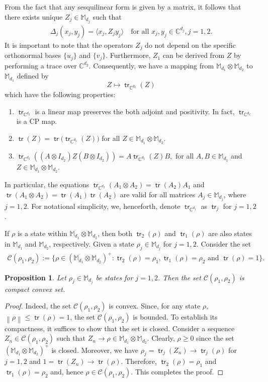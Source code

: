 \documentclass[10pt,reqno]{amsart}
\theoremstyle{definition}
\theoremstyle{plain}
\newtheorem{prop}[defn]{Proposition}
\theoremstyle{remark}
\renewcommand{\sf}[1]{\textsf{#1}}
\newcommand{\mbb}[1]{\mathbb{#1}}
\newcommand{\msc}[1]{\mathscr{#1}}
\newcommand{\norm}[1]{\left\lVert#1\right\rVert}
\newcommand{\M}[1]{\mbb{M}_{#1}}%
\newcommand{\ip}[1]{\langle#1\rangle}
\DeclareMathOperator{\tr}{\sf{tr}}
\numberwithin{equation}{section}%
\begin{document}
From the fact that any sesquilinear form is given by a matrix, it follows that there exists unique $Z_j\in\M{d_j}$ such that 
\begin{align*}
	\Delta_j(x_j,y_j)=\ip{x_j, Z_jy_j} \quad \text{for all } x_j,y_j\in\mbb{C}^{d_j}, j=1,2.
\end{align*}
It is important to note that the operators $Z_j$ do not depend on the specific orthonormal bases $\{u_j\}$ and $\{v_j\}$. Furthermore, $Z_1$ can be derived from $Z$ by performing a trace over $\mbb{C}^{d_2}$. Consequently, we have a mapping from $\M{d_1}\otimes\M{d_2}$ to $\M{d_1}$ defined by
$$Z\mapsto\tr_{\mbb{C}^{d_2}}(Z)$$
which have the following properties:
\begin{enumerate}[label=(\roman*)]
	\item $\tr_{\mbb{C}^{d_2}}$ is a linear map preserves the both adjoint and positivity. In fact, $\tr_{\mbb{C}^{d_2}}$ is a CP map.
	\item $\tr(Z)=\tr\big(\tr_{\mbb{C}^{d_2}}(Z)\big)$ for all $Z\in\M{d_1}\otimes\M{d_2}$.
	\item $\tr_{\mbb{C}^{d_2}}((A\otimes I_{d_2})Z(B\otimes I_{d_2}))=A\tr_{\mbb{C}^{d_2}}(Z)B,$ for all $A,B\in\M{d_1}$ and $Z\in\M{d_1}\otimes\M{d_2}$. 
\end{enumerate}
 In particular, the equations $\tr_{\mbb{C}^{d_2}}(A_1\otimes A_2)=\tr(A_2)A_1$ and $\tr(A_1\otimes A_2)=\tr(A_1)\tr(A_2)$ are valid for all matrices $A_j\in\M{d_j}$, where $j=1,2$. For notational simplicity, we, henceforth, denote $\tr_{\mbb{C}^{d_j}}$ as $\tr_j$ for $j=1,2$.
 
 
 
 If $\rho$ is a state within $\M{d_1}\otimes\M{d_2}$, then both $\tr_2(\rho)$ and $\tr_1(\rho)$ are also states in $\M{d_1}$ and $\M{d_2}$, respectively. Given a state $\rho_j\in\M{d_j}$ for $j=1,2$. Consider the set 
 \begin{align*}
 	\msc{C}(\rho_1,\rho_2):=\{\rho\in(\M{d_1}\otimes\M{d_2})^+: \tr_2(\rho)=\rho_1, \tr_1(\rho)=\rho_2 \mbox{ and } \tr(\rho)=1\}.
 \end{align*}
 
 
 
 \begin{prop}
 	Let $\rho_j\in\M{d_j}$  be states for $j=1,2$. Then the set   $\msc{C}(\rho_1,\rho_2)$ is compact convex set.
 \end{prop}
 
 
 \begin{proof}
 	Indeed, the set $\msc{C}(\rho_1,\rho_2)$ is convex. Since, for any state $\rho$,  $\norm{\rho} \leq \tr(\rho) = 1$, the set $\msc{C}(\rho_1,\rho_2)$ is bounded. To establish its compactness, it suffices to show that the set is closed. Consider a sequence $Z_n \in \msc{C}(\rho_1,\rho_2)$ such that $Z_n \to \rho \in \M{d_1} \otimes \M{d_2}$. Clearly, $\rho\geq 0$ since the set $(\M{d_1} \otimes \M{d_2})^+$ is closed. Moreover, we have $\rho_j = \tr_j(Z_n) \to \tr_j(\rho)$ for $j=1,2$ and $1=\tr(Z_n) \to \tr(\rho)$. Therefore, $\tr_2(\rho) = \rho_1$ and $\tr_1(\rho) = \rho_2$ and, hence $\rho\in\msc{C}(\rho_1,\rho_2)$. This completes the proof.
 \end{proof}
 
\end{document}
